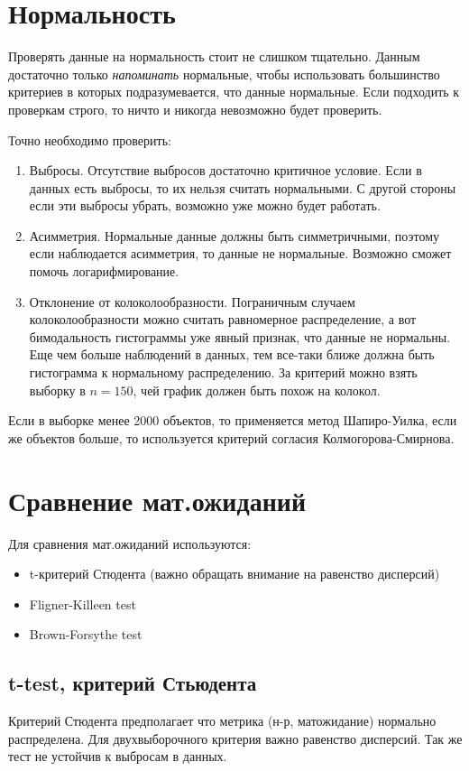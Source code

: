 \documentclass[a4paper, oneside]{book}
\begin{document}
\section{Нормальность}
Проверять данные на нормальность стоит не слишком тщательно. Данным достаточно только \emph{напоминать} нормальные, чтобы использовать большинство критериев в которых подразумевается, что данные нормальные. Если подходить к проверкам строго, то ничто и никогда невозможно будет проверить. 

Точно необходимо проверить:
\begin{enumerate}
    \item Выбросы. Отсутствие выбросов достаточно критичное условие. Если в данных есть выбросы, то их нельзя считать нормальными. С другой стороны если эти выбросы убрать, возможно уже можно будет работать.

    \item Асимметрия. Нормальные данные должны быть симметричными, поэтому если наблюдается асимметрия, то данные не нормальные. Возможно сможет помочь логарифмирование. 

    \item Отклонение от колоколообразности. Пограничным случаем колоколообразности можно считать равномерное распределение, а вот бимодальность гистограммы уже явный признак, что данные не нормальны. Еще чем больше наблюдений в данных, тем все-таки ближе должна быть гистограмма к нормальному распределению. За критерий можно взять выборку в $n=150$, чей график должен быть похож на колокол.
\end{enumerate}

Если в выборке менее 2000 объектов, то применяется метод Шапиро-Уилка, если же объектов больше, то используется критерий согласия Колмогорова-Смирнова.

\section{Сравнение мат.ожиданий}
Для сравнения мат.ожиданий используются:
\begin{itemize}
    \item t-критерий Стюдента (важно обращать внимание на равенство дисперсий)
    \item Fligner-Killeen test
    \item Brown-Forsythe test
\end{itemize}

\subsection{t-test, критерий Стьюдента}
Критерий Стюдента предполагает что метрика (н-р, матожидание) нормально распределена. Для двухвыборочного критерия важно равенство дисперсий. Так же тест не устойчив к выбросам в данных.
\end{document}
